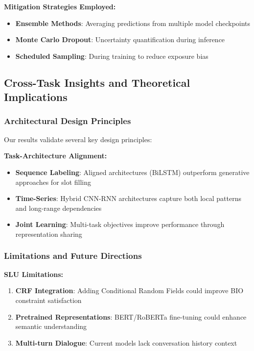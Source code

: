 \documentclass[conference]{IEEEtran}
\begin{document}
\textbf{Mitigation Strategies Employed:}
\begin{itemize}
  \item \textbf{Ensemble Methods}: Averaging predictions from multiple model checkpoints
  \item \textbf{Monte Carlo Dropout}: Uncertainty quantification during inference
  \item \textbf{Scheduled Sampling}: During training to reduce exposure bias
\end{itemize}

\subsection{Cross-Task Insights and Theoretical Implications}

\subsubsection{Architectural Design Principles}
Our results validate several key design principles:

\textbf{Task-Architecture Alignment:}
\begin{itemize}
  \item \textbf{Sequence Labeling}: Aligned architectures (BiLSTM) outperform generative approaches for slot filling
  \item \textbf{Time-Series}: Hybrid CNN-RNN architectures capture both local patterns and long-range dependencies
  \item \textbf{Joint Learning}: Multi-task objectives improve performance through representation sharing
\end{itemize}

\subsubsection{Limitations and Future Directions}

\textbf{SLU Limitations:}
\begin{enumerate}
  \item \textbf{CRF Integration}: Adding Conditional Random Fields could improve BIO constraint satisfaction
  \item \textbf{Pretrained Representations}: BERT/RoBERTa fine-tuning could enhance semantic understanding
  \item \textbf{Multi-turn Dialogue}: Current models lack conversation history context
\end{enumerate}
\end{document}
